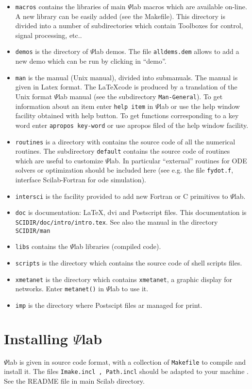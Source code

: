 \begin{itemize}
\item{{\tt macros} contains the libraries of main $\Psi$lab macros
which are available on-line. A new library can be easily added 
(see the Makefile). This directory is divided into a number of subdirectories
which contain Toolboxes for control, signal processing, etc..}

\item{{\tt demos} is the directory of $\Psi$lab demos. The file 
{\tt alldems.dem} allows to add a new demo which can be run by 
clicking in ``demo''.}

\item{{\tt man} is the manual (Unix manual), divided into submanuals.
The manual is given in Latex format. The \LaTeX code is produced by a 
translation of the Unix format $\Psi$lab manual (see the subdirectory
{\tt Man-General}).}
To get information about an item enter {\tt help item} in $\Psi$lab
or use the help window facility obtained with help button.
To get functions corresponding to a key word enter {\tt apropos
key-word}
or use apropos filed of the help window facility.


\item{{\tt routines} is a directory with contains the source code of all
the numerical routines. The subdirectory {\tt default} contains the
source code of routines which are useful to customize $\Psi$lab.}
In particular ``external'' routines for ODE solvers or optimization
should be included here (see e.g. the file {\tt fydot.f}, interface
Scilab-Fortran for ode simulation).
\item{{\tt intersci} is the facility provided to add new Fortran or C 
primitives to $\Psi$lab.}

\item{{\tt doc} is documentation: \LaTeX, dvi and Postscript files. 
This documentation is {\tt SCIDIR/doc/intro/intro.tex}. See 
also the manual in the directory {\tt SCIDIR/man}}

\item{{\tt libs} contains the $\Psi$lab libraries (compiled code).}

\item{{\tt scripts} is the directory which contains the source code of 
shell scripts files.}

\item{{\tt xmetanet} is the directory which contains {\tt xmetanet}, a 
graphic display for networks. Enter {\tt metanet()} in $\Psi$lab to use it.}

\item{{\tt imp}} is the directory where Postscipt files ar managed for
print.

\end{itemize}

\section{Installing $\Psi$lab}
\label{install}
$\Psi$lab is given in source code format, with a collection
of {\tt Makefile} to compile and install it.
The files {\tt Imake.incl , Path.incl} should be adapted to your
machine . See the README file in main Scilab directory.
